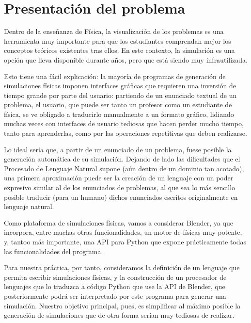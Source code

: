 \documentclass[12pt]{article}
\begin{document}

\tableofcontents
\pagebreak


\section{Presentación del problema}

Dentro de la enseñanza de Física, la visualización de los problemas es una herramienta muy importante para que los estudiantes comprendan mejor los conceptos teóricos existentes tras ellos. En este contexto, la simulación es una opción que lleva disponible durante años, pero que está siendo muy infrautilizada.

Esto tiene una fácil explicación: la mayoría de programas de generación de simulaciones físicas imponen interfaces gráficas que requieren una inversión de tiempo grande por parte del usuario: partiendo de un enunciado textual de un problema, el usuario, que puede ser tanto un profesor como un estudiante de física, se ve obligado a traducirlo manualmente a un formato gráfico, lidiando muchas veces con interfaces de usuario tediosas que hacen perder mucho tiempo, tanto para aprenderlas, como por las operaciones repetitivas que deben realizarse. 

Lo ideal sería que, a partir de un enunciado de un problema, fuese posible la generación automática de su simulación. Dejando de lado las dificultades que el Procesado de Lenguaje Natural supone (aún dentro de un dominio tan acotado), una primera aproximación puede ser la creación de un lenguaje con un poder expresivo similar al de los enunciados de problemas, al que sea lo más sencillo posible traducir (para un humano) dichos enunciados escritos originalmente en lenguaje natural.

Como plataforma de simulaciones físicas, vamos a considerar Blender, ya que incorpora, entre muchas otras funcionalidades, un motor de físicas muy potente, y, tantoo más importante, una API para Python que expone prácticamente todas las funcionalidades del programa.

Para nuestra práctica, por tanto, consideramos la definición de un lenguaje que permita escribir simulaciones físicas, y la construcción de un procesador de lenguajes que lo traduzca a código Python que use la API de Blender, que posteriormente podrá ser interpretado por este programa para generar una simulación. Nuestro objetivo principal, pues, es simplificar al máximo posible la generación de simulaciones que de otra forma serían muy tediosas de realizar.
\end{document}
